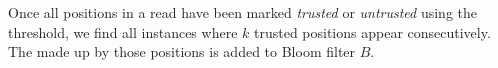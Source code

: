 \documentclass[10pt]{article}
\begin{document}







Once all positions in a read have been marked \emph{trusted} or \emph{untrusted} using the threshold, we find all instances where $k$ trusted positions appear consecutively.  The \kmer made up by those positions is added to Bloom filter $B$.
\end{document}
